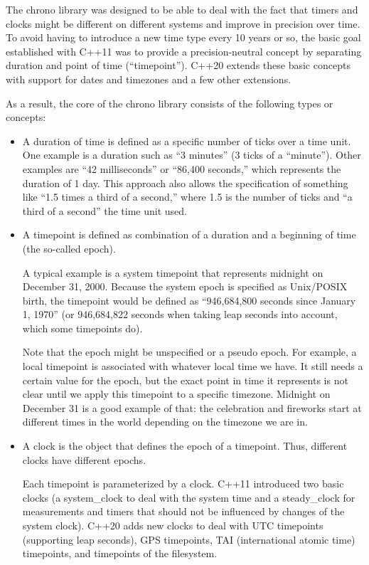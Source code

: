 The chrono library was designed to be able to deal with the fact that timers and clocks might be different on different systems and improve in precision over time. To avoid having to introduce a new time type every 10 years or so, the basic goal established with C++11 was to provide a precision-neutral concept by separating duration and point of time (“timepoint”). C++20 extends these basic concepts with support for dates and timezones and a few other extensions.

As a result, the core of the chrono library consists of the following types or concepts:

\begin{itemize}
\item 
A duration of time is defined as a specific number of ticks over a time unit. One example is a duration such as “3 minutes” (3 ticks of a “minute”). Other examples are “42 milliseconds” or “86,400 seconds,” which represents the duration of 1 day. This approach also allows the specification of something like “1.5 times a third of a second,” where 1.5 is the number of ticks and “a third of a second” the time unit used.

\item
A timepoint is defined as combination of a duration and a beginning of time (the so-called epoch).

A typical example is a system timepoint that represents midnight on December 31, 2000. Because the system epoch is specified as Unix/POSIX birth, the timepoint would be defined as “946,684,800 seconds since January 1, 1970” (or 946,684,822 seconds when taking leap seconds into account, which some timepoints do).

Note that the epoch might be unspecified or a pseudo epoch. For example, a local timepoint is associated with whatever local time we have. It still needs a certain value for the epoch, but the exact point in time it represents is not clear until we apply this timepoint to a specific timezone. Midnight on December 31 is a good example of that: the celebration and fireworks start at different times in the world depending on the timezone we are in.

\item
A clock is the object that defines the epoch of a timepoint. Thus, different clocks have different epochs.

Each timepoint is parameterized by a clock.
C++11 introduced two basic clocks (a system\_clock to deal with the system time and a steady\_clock for measurements and timers that should not be influenced by changes of the system clock). C++20 adds new clocks to deal with UTC timepoints (supporting leap seconds), GPS timepoints, TAI (international atomic time) timepoints, and timepoints of the filesystem.


\end{itemize}
